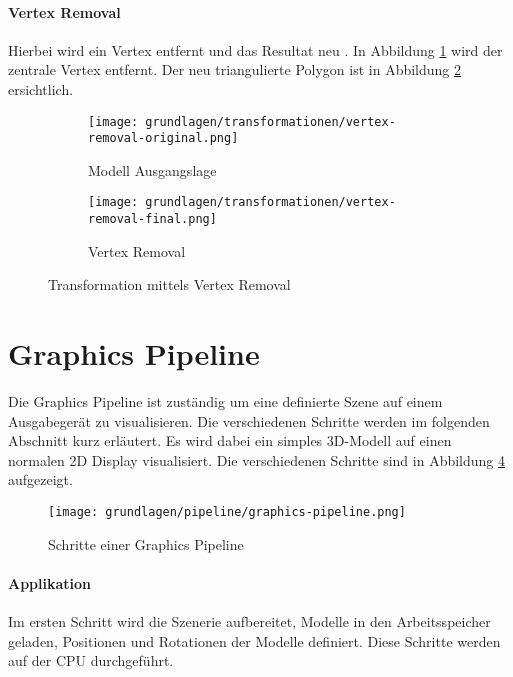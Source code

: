 \paragraph{Vertex Removal}
Hierbei wird ein Vertex entfernt und das Resultat neu .
In Abbildung \ref{fig:transformationVertexRemovalOriginal} wird der zentrale Vertex entfernt. Der neu triangulierte Polygon ist in Abbildung \ref{fig:transformationVertexRemovalFinal} ersichtlich.

\begin{figure}[H]
  \centering
  \begin{subfigure}{.5\textwidth}
    \centering
    \texttt{[image: grundlagen/transformationen/vertex-removal-original.png]}
    \caption{Modell Ausgangslage}
    \label{fig:transformationVertexRemovalOriginal}
  \end{subfigure}%
  \begin{subfigure}{.5\textwidth}
    \centering
    \texttt{[image: grundlagen/transformationen/vertex-removal-final.png]}
    \caption{Vertex Removal}
    \label{fig:transformationVertexRemovalFinal}
  \end{subfigure}
  \caption{Transformation mittels Vertex Removal}
  \label{fig:transformationVertexRemoval}
\end{figure}

\section{Graphics Pipeline}
Die Graphics Pipeline ist zuständig um eine definierte Szene auf einem Ausgabegerät zu visualisieren. Die verschiedenen Schritte werden im folgenden Abschnitt kurz erläutert. Es wird dabei ein simples 3D-Modell auf einen normalen 2D Display visualisiert. Die verschiedenen Schritte sind in Abbildung \ref{fig:renderingPipelineOverview} aufgezeigt.

\begin{figure}[H]
  \centering
  \texttt{[image: grundlagen/pipeline/graphics-pipeline.png]}
  \caption{Schritte einer Graphics Pipeline}
  \label{fig:renderingPipelineOverview}
\end{figure}

\paragraph{Applikation}
Im ersten Schritt wird die Szenerie aufbereitet, Modelle in den Arbeitsspeicher geladen, Positionen und Rotationen der Modelle definiert. Diese Schritte werden auf der CPU durchgeführt.

